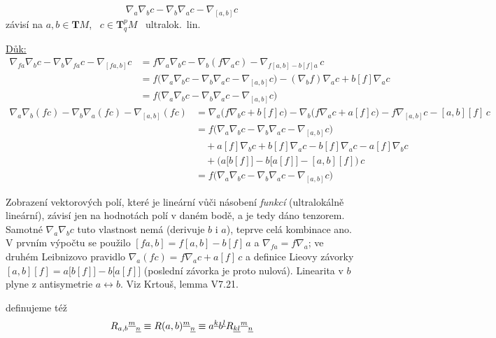 \begin{veta}[Lemma]
\[
  \nabla_a\nabla_b c - \nabla_b\nabla_a c - \nabla_{[a,b]}c
\]
závisí na $a,b\in\mathbf{T}M$, \ $c\in\mathbf{T}^p_q M$ \ ultralok.\ lin.
\end{veta}

\underline{Důk:}
\begin{align*}
  \nabla_{fa}\nabla_b c - \nabla_b\nabla_{fa}c - \nabla_{[fa,b]}c
  &= f\nabla_a\nabla_b c - \nabla_b(f\nabla_a c) - \nabla_{f[a,b]-b[f]a}\,c \\
  &= f\big(\nabla_a\nabla_b c - \nabla_b\nabla_a c - \nabla_{[a,b]}c\big) - (\nabla_b f)\nabla_a c + b[f]\nabla_a c \\
  &= f\big(\nabla_a\nabla_b c - \nabla_b\nabla_a c - \nabla_{[a,b]}c\big)
\end{align*}
\begin{align*}
  \nabla_a\nabla_b(fc) - \nabla_b\nabla_a(fc) - \nabla_{[a,b]}(fc)
  &= \nabla_a\big(f\nabla_b c + b[f]c\big) - \nabla_b\big(f\nabla_a c + a[f]c\big) - f\nabla_{[a,b]}c - [a,b][f]\,c \\
  &= f\big(\nabla_a\nabla_b c - \nabla_b\nabla_a c - \nabla_{[a,b]}c\big) \\
  &\quad + a[f]\nabla_b c + b[f]\nabla_a c - b[f]\nabla_a c - a[f]\nabla_b c \\
  &\quad + \big(a\big[b[f]\big] - b\big[a[f]\big] - [a,b][f]\big)\,c \\
  &= f\big(\nabla_a\nabla_b c - \nabla_b\nabla_a c - \nabla_{[a,b]}c\big)
\end{align*}

\begin{vysvetleni}
Zobrazení vektorových polí, které je lineární vůči násobení \emph{funkcí} (ultralokálně lineární), závisí jen na hodnotách polí v daném bodě, a je tedy dáno tenzorem. Samotné $\nabla_a\nabla_b c$ tuto vlastnost nemá (derivuje $b$ i $a$), teprve celá kombinace ano.
V prvním výpočtu se použilo $[fa,b]=f[a,b]-b[f]\,a$ a $\nabla_{fa}=f\nabla_a$; ve druhém Leibnizovo pravidlo $\nabla_a(fc)=f\nabla_a c+a[f]\,c$ a definice Lieovy závorky $[a,b][f]=a\big[b[f]\big]-b\big[a[f]\big]$ (poslední závorka je proto nulová). Linearita v $b$ plyne z antisymetrie $a\leftrightarrow b$.
Viz Krtouš, lemma V7.21.
\end{vysvetleni}

definujeme též
\[
  R_{a,b}{}^{\underline{m}}{}_{\underline{n}} \equiv R(a,b)^{\underline{m}}{}_{\underline{n}}
  \equiv a^{\underline{k}}b^{\underline{l}}R_{\underline{kl}}{}^{\underline{m}}{}_{\underline{n}}
\]

